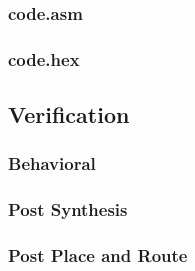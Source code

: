 \documentclass[11pt,letterpaper,final]{article}
\begin{document}
\subsubsection{code.asm}
\label{s2/code.asm}
\begin{scriptsize}
\end{scriptsize}
\subsubsection{code.hex}
\label{s2/code.hex}
\begin{scriptsize}
\end{scriptsize}

\subsection{Verification}
\subsubsection{Behavioral}
\label{s2/behaviour}
\begin{scriptsize}
\end{scriptsize}
\subsubsection{Post Synthesis}
\label{s2/postsyn}
\begin{scriptsize}
\end{scriptsize}
\subsubsection{Post Place and Route}
\label{s2/postpr}
\begin{scriptsize}
\end{scriptsize}
\end{document}
